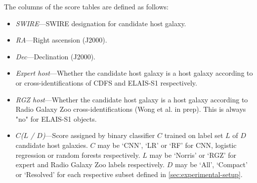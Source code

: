   The columns of the score tables are defined as follows:
  \begin{itemize}
    \item \emph{SWIRE}---SWIRE designation for candidate host galaxy.
    \item \emph{RA}---Right ascension (J2000).
    \item \emph{Dec}---Declination (J2000).
    \item \emph{Expert host}---Whether the candidate host galaxy is a host galaxy according to \citet{norris06} or \citet{middelberg08} cross-identifications of CDFS and ELAIS-S1 respectively.
    \item \emph{RGZ host}---Whether the candidate host galaxy is a host galaxy according to Radio Galaxy Zoo cross-identifications (Wong et al. in prep). This is always "no" for ELAIS-S1 objects.
    \item \emph{$C$($L$ / $D$)}---Score assigned by binary classifier $C$ trained on label set $L$ of $D$ candidate host galaxies. $C$ may be `CNN', `LR' or `RF' for CNN, logistic regression or random forests respectively. $L$ may be `Norris' or `RGZ' for expert and Radio Galaxy Zoo labels respectively. $D$ may be `All', `Compact' or `Resolved' for each respective subset defined in \autoref{sec:experimental-setup}.
  \end{itemize}

